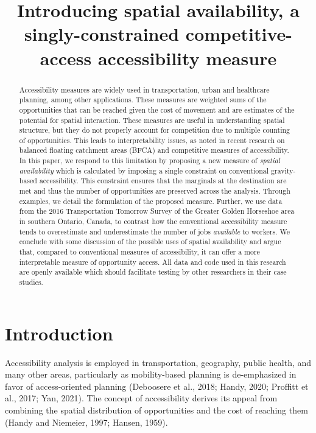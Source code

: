\documentclass[]{elsarticle} %
\begin{document}
\begin{frontmatter}

  \title{Introducing spatial availability, a singly-constrained
competitive-access accessibility measure}
      
  \begin{abstract}
  Accessibility measures are widely used in transportation, urban and
  healthcare planning, among other applications. These measures are
  weighted sums of the opportunities that can be reached given the cost
  of movement and are estimates of the potential for spatial
  interaction. These measures are useful in understanding spatial
  structure, but they do not properly account for competition due to
  multiple counting of opportunities. This leads to interpretability
  issues, as noted in recent research on balanced floating catchment
  areas (BFCA) and competitive measures of accessibility. In this paper,
  we respond to this limitation by proposing a new measure of
  \emph{spatial availability} which is calculated by imposing a single
  constraint on conventional gravity-based accessibility. This
  constraint ensures that the marginals at the destination are met and
  thus the number of opportunities are preserved across the analysis.
  Through examples, we detail the formulation of the proposed measure.
  Further, we use data from the 2016 Transportation Tomorrow Survey of
  the Greater Golden Horseshoe area in southern Ontario, Canada, to
  contrast how the conventional accessibility measure tends to
  overestimate and underestimate the number of jobs \emph{available} to
  workers. We conclude with some discussion of the possible uses of
  spatial availability and argue that, compared to conventional measures
  of accessibility, it can offer a more interpretable measure of
  opportunity access. All data and code used in this research are openly
  available which should facilitate testing by other researchers in
  their case studies.
  \end{abstract}
  
 \end{frontmatter}

\newpage

\hypertarget{introduction}{%
\section{Introduction}\label{introduction}}

Accessibility analysis is employed in transportation, geography, public
health, and many other areas, particularly as mobility-based planning is
de-emphasized in favor of access-oriented planning (Deboosere et al.,
2018; Handy, 2020; Proffitt et al., 2017; Yan, 2021). The concept of
accessibility derives its appeal from combining the spatial distribution
of opportunities and the cost of reaching them (Handy and Niemeier,
1997; Hansen, 1959).
\end{document}
